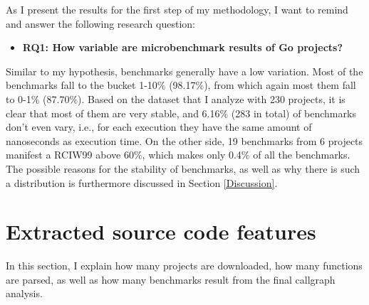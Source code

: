 \documentclass{seal_thesis}
\begin{document}
\noindent As I present the results for the first step of my methodology, I want to remind and answer the following research question:

\begin{itemize}
	\item \textbf{RQ1: How variable are microbenchmark results of Go projects?}
\end{itemize}

\noindent Similar to my hypothesis, benchmarks generally have a low variation. Most of the benchmarks fall to the bucket 1-10\% (98.17\%), from which again most them fall to 0-1\% (87.70\%). Based on the dataset that I analyze with 230 projects, it is clear that most of them are very stable, and 6.16\% (283 in total) of benchmarks don't even vary, i.e., for each execution they have the same amount of nanoseconds as execution time. On the other side, 19 benchmarks from 6 projects manifest a RCIW99 above 60\%, which makes only 0.4\% of all the benchmarks. The possible reasons for the stability of benchmarks, as well as why there is such a distribution is furthermore discussed in Section \ref{Discussion}.


\section{Extracted source code features}
\label{Extracted source code features}

In this section, I explain how many projects are downloaded, how many functions are parsed, as well as how many benchmarks result from the final callgraph analysis.
\end{document}
